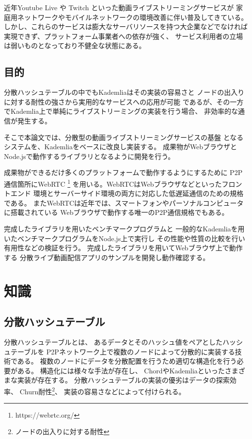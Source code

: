 \documentclass[sotsuron]{jcsie}
\begin{document}
近年Youtube Live や Twitch といった動画ライブストリーミングサービスが
家庭用ネットワークやモバイルネットワークの環境改善に伴い普及してきている。
しかし、これらのサービスは膨大なサーバリソースを持つ大企業などでなければ
実現できず、プラットフォーム事業者への依存が強く、
サービス利用者の立場は弱いものとなっており不健全な状態にある。

\section{目的}
分散ハッシュテーブルの中でもKademliaはその実装の容易さと
ノードの出入りに対する耐性の強さから実用的なサービスへの応用が可能
であるが、その一方でKademlia上で単純にライブストリーミングの実装を行う場合、
非効率的な通信が発生する。

そこで本論文では、分散型の動画ライブストリーミングサービスの基盤
となるシステムを、Kademliaをベースに改良し実装する。
成果物がWebブラウザとNode.jsで動作するライブラリとなるように開発を行う。

成果物ができるだけ多くのプラットフォームで動作するようにするために
P2P通信箇所にWebRTC \footnote{https://webrtc.org/}
を用いる。WebRTCはWebブラウザなどといったフロントエンド
環境とサーバーサイド環境の両方に対応した低遅延通信のための規格である。
またWebRTCは近年では、スマートフォンやパーソナルコンピュータに搭載されている
Webブラウザで動作する唯一のP2P通信規格でもある。

完成したライブラリを用いたベンチマークプログラムと
一般的なKademliaを用いたベンチマークプログラムをNode.js上で実行し
その性能や性質の比較を行い有用性などの検証を行う。
完成したライブラリを用いてWebブラウザ上で動作する
分散ライブ動画配信アプリのサンプルを開発し動作確認する。


\chapter{知識}
\section{分散ハッシュテーブル}
分散ハッシュテーブルとは、
あるデータとそのハッシュ値をペアとしたハッシュテーブルを
P2Pネットワーク上で複数のノードによって分散的に実装する技術である。
複数のノードにデータを分散配置を行うため適切な構造化を行う必要がある。
構造化には様々な手法が存在し、
ChordやKademliaといったさまざまな実装が存在する。
分散ハッシュテーブルの実装の優劣はデータの探索効率、
Churn耐性\footnote{ノードの出入りに対する耐性}、
実装の容易さなどによって付けられる。
\end{document}

